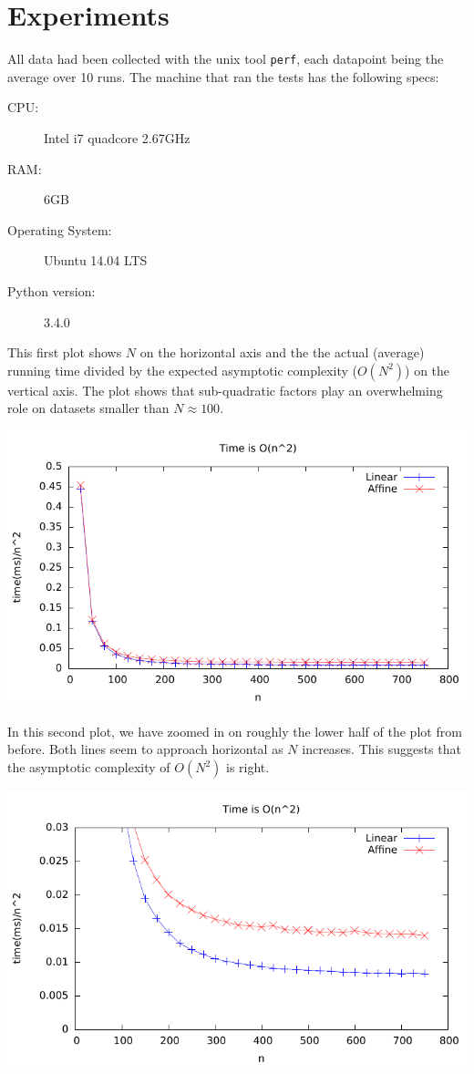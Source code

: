 \section{Experiments}

All data had been collected with the unix tool \verb|perf|, each
datapoint being the average over 10 runs. The machine that ran the
tests has the following specs:
\begin{description}
\item[CPU:] Intel i7 quadcore 2.67GHz
\item[RAM:] 6GB
\item[Operating System:] Ubuntu 14.04 LTS
\item[Python version:] 3.4.0
\end{description}

This first plot shows $N$ on the horizontal axis and the the actual
(average) running time divided by the expected asymptotic complexity
($O(N^2)$) on the vertical axis. The plot shows that sub-quadratic
factors play an overwhelming role on datasets smaller than $N \approx
100$.
\begin{center}
	\includegraphics[width=\textwidth]{../plots/plot1.pdf}
\end{center}

In this second plot, we have zoomed in on roughly the lower half of
the plot from before. Both lines seem to approach horizontal as $N$
increases. This suggests that the asymptotic complexity of $O(N^2)$ is
right.
\begin{center}
	\includegraphics[width=\textwidth]{../plots/plot2.pdf}
\end{center}

